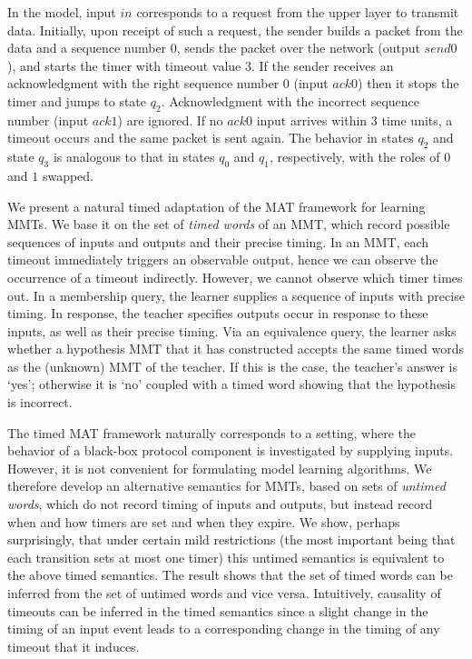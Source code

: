 In the model, input $\mathit{in}$ corresponds to a request from the upper layer to transmit data.
Initially, upon receipt of such a request, the sender builds a packet from the data and a sequence number $0$,
sends the packet over the network (output $\mathit{send0}$), and starts the timer with timeout value $3$.
If the sender receives an acknowledgment with the right sequence number $0$ (input $\mathit{ack0}$) 
then it stops the timer and jumps to state $q_2$.
Acknowledgment with the incorrect sequence number (input $\mathit{ack1}$) are ignored.
If no $\mathit{ack0}$ input arrives within $3$ time units, a timeout occurs and the same packet is sent again.
The behavior in states $q_2$ and state $q_3$ is analogous to that in states $q_0$ and $q_1$, respectively,
with the roles of $0$ and $1$ swapped.
\fi

We present a natural timed adaptation of the MAT framework for learning MMTs.
We base it on the set of {\em timed words} of an MMT, which record possible
sequences of inputs and outputs and their precise timing.
In an MMT, each timeout immediately triggers an observable output, hence
we can observe the occurrence of a timeout indirectly. However,
we cannot observe which timer times out.
In a membership query, the learner supplies a sequence of inputs with
precise timing.
In response, the teacher specifies outputs occur in response to these inputs,
as well as their precise timing.
Via an equivalence query, the learner asks whether a hypothesis MMT that it has
constructed accepts the same timed words
as the (unknown) MMT of the teacher. If this is the case,
the teacher's answer is `yes';
otherwise it is `no' coupled with a timed word showing that the
hypothesis is incorrect.

The timed MAT framework naturally corresponds to a setting, where the behavior
of a black-box protocol component is investigated by supplying inputs. However,
it is not convenient for formulating model learning algorithms. We therefore
develop an alternative semantics for MMTs, based on sets of {\em untimed words},
which do not record timing of inputs and outputs, but instead record when and how timers are set and when they expire. We show, perhaps surprisingly, that
under certain mild restrictions (the most important being that each transition
sets at most one timer) this untimed semantics is equivalent to the above
timed semantics. The result shows that the set of timed words can be inferred
from the set of untimed words and vice versa.
Intuitively, causality of timeouts can be inferred in the timed semantics since a slight change in the timing of an input event leads to a corresponding change in the timing of any timeout that it induces.

